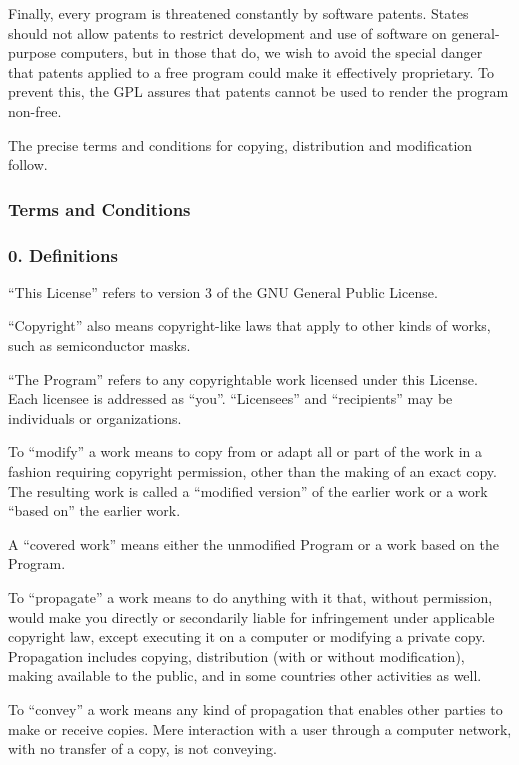 \documentclass[a4paper, 11pt, twoside]{article}
\begin{document}
Finally, every program is threatened constantly by software patents. States should not allow patents to restrict development and use of software on general-purpose computers, but in those that do, we wish to avoid the special danger that patents applied to a free program could make it effectively proprietary. To prevent this, the GPL assures that patents cannot be used to render the program non-free.

The precise terms and conditions for copying, distribution and modification follow.

\subsubsection{Terms and Conditions}

\subsubsection{0. Definitions}

“This License” refers to version 3 of the GNU General Public License.

“Copyright” also means copyright-like laws that apply to other kinds of works, such as semiconductor masks.

“The Program” refers to any copyrightable work licensed under this License. Each licensee is addressed as “you”. “Licensees” and “recipients” may be individuals or organizations.

To “modify” a work means to copy from or adapt all or part of the work in a fashion requiring copyright permission, other than the making of an exact copy. The resulting work is called a “modified version” of the earlier work or a work “based on” the earlier work.

A “covered work” means either the unmodified Program or a work based on the Program.

To “propagate” a work means to do anything with it that, without permission, would make you directly or secondarily liable for infringement under applicable copyright law, except executing it on a computer or modifying a private copy. Propagation includes copying, distribution (with or without modification), making available to the public, and in some countries other activities as well.

To “convey” a work means any kind of propagation that enables other parties to make or receive copies. Mere interaction with a user through a computer network, with no transfer of a copy, is not conveying.
\end{document}
